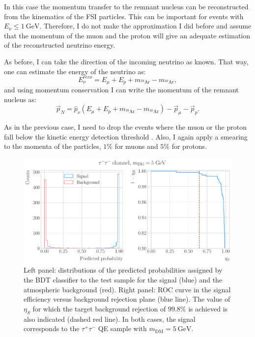 In this case the momentum transfer to the remnant nucleus can be reconstructed from the kinematics of the FSI particles. This can be important for events with $E_{\nu} \leq 1 ~ \mathrm{GeV}$. Therefore, I do not make the approximation I did before and assume that the momentum of the muon and the proton will give an adequate estimation of the reconstructed neutrino energy.

As before, I can take the direction of the incoming neutrino as known. That way, one can estimate the energy of the neutrino as:
\begin{equation}\label{6.6}
	E_{\nu}^{reco} = E_{\mu} + E_{p} + m_{^{39}\mathrm{Ar}} - m_{^{40}\mathrm{Ar}},
\end{equation}
and using momentum conservation I can write the momentum of the remnant nucleus as:
\begin{equation}\label{6.7}
	\vec{p}_{N} = \hat{p}_{\nu} \left(E_{\mu} + E_{p} + m_{^{39}\mathrm{Ar}} - m_{^{40}\mathrm{Ar}}\right) - \vec{p}_{\mu} - \vec{p}_{p}.
\end{equation}

As in the previous case, I need to drop the events where the muon or the proton fall below the kinetic energy detection threshold \cite{DUNE2020TDR2}. Also, I again apply a smearing to the momenta of the particles, $1\%$ for muons and $5\%$ for protons.

\begin{figure}[t]
	\centering
	\includegraphics[width=0.95\linewidth]{Images/DM_Analysis/solardm_tau_5_qel_bdt_classifier.pdf}
	\caption[Performance of the BDT classifier for the $\tau^{+}\tau^{-}$ QE signal with $m_{\mathrm{DM}} = 5 \ \mathrm{GeV}$.]{Left panel: distributions of the predicted probabilities assigned by the BDT classifier to the test sample for the signal (blue) and the atmospheric background (red). Right panel: ROC curve in the signal efficiency versus background rejection plane (blue line). The value of $\eta_{S}$ for which the target background rejection of $99.8\%$ is achieved is also indicated (dashed red line). In both cases, the signal corresponds to the $\tau^{+}\tau^{-}$ QE sample with $m_{\mathrm{DM}} = 5 \ \mathrm{GeV}$.}
	\label{fig:solardm_tau_5_qel_classifier}
\end{figure}

